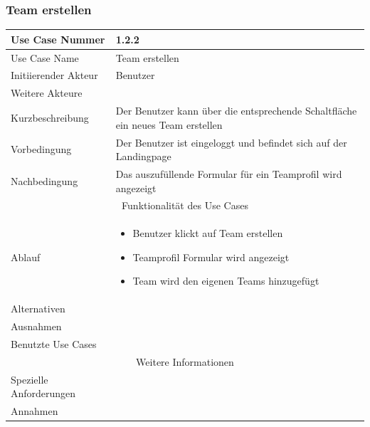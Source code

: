 \documentclass[10pt,a4paper]{article}
\begin{document}
		\subsubsection{Team erstellen}
		\begin{tabular}{|l|p{.5\linewidth}|}
				\hline Use Case Nummer & 1.2.2 \\ 
				\hline Use Case Name & Team erstellen \\ 
				\hline Initiierender Akteur & Benutzer \\
				\hline Weitere Akteure & \\
				\hline Kurzbeschreibung & Der Benutzer kann über die entsprechende Schaltfläche ein neues Team erstellen \\
				\hline Vorbedingung & Der Benutzer ist eingeloggt und befindet sich auf der Landingpage \\
				\hline Nachbedingung & Das auszufüllende Formular für ein Teamprofil wird angezeigt \\
				\hline \multicolumn{2}{|c|}{Funktionalität des Use Cases}\\
				\hline Ablauf & \begin{itemize}
					\item Benutzer klickt auf Team erstellen
					\item Teamprofil Formular wird angezeigt
					\item Team wird den eigenen Teams hinzugefügt
				\end{itemize} \\
				\hline Alternativen & \\
				\hline Ausnahmen & \\
				\hline Benutzte Use Cases & \\
				\hline \multicolumn{2}{|c|}{Weitere Informationen} \\
				\hline Spezielle Anforderungen & \\
				\hline Annahmen & \\
				\hline
		\end{tabular}
			
\end{document}

